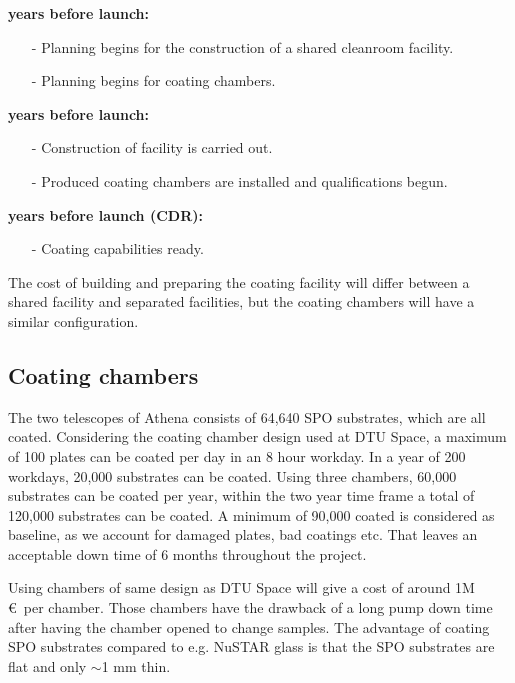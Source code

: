 \begin{description}[itemsep=1.5pt,parsep=1pt]
	\item[9] \textbf{years before launch:}
		\begin{itemize}[itemsep=1.5pt,parsep=1pt]
		\item[-] Planning begins for the construction of a shared cleanroom facility.
		\item[-] Planning begins for coating chambers.
		\end{itemize}
	\item[7-8] \textbf{years before launch:}
		\begin{itemize}[itemsep=1.5pt,parsep=1pt]
		\item[-] Construction of facility is carried out.
		\item[-] Produced coating chambers are installed and qualifications begun.
		\end{itemize}
	\item[6] \textbf{years before launch (CDR):}
		\begin{itemize}[itemsep=1.5pt,parsep=1pt]
		\item[-] Coating capabilities ready.
		\end{itemize}
\end{description}

The cost of building and preparing the coating facility will differ between a shared facility and separated facilities, but the coating chambers will have a similar configuration.

\subsection{Coating chambers}\label{sec:chambers}
The two telescopes of Athena consists of 64,640 SPO substrates, which are all coated. Considering the coating chamber design used at DTU Space, a maximum of 100 plates can be coated per day in an 8 hour workday. In a year of 200 workdays, 20,000 substrates can be coated. Using three chambers, 60,000 substrates can be coated per year, within the two year time frame a total of 120,000 substrates can be coated. A minimum of 90,000 coated is considered as baseline, as we account for damaged plates, bad coatings etc. That leaves an acceptable down time of 6 months throughout the project.

Using chambers of same design as DTU Space will give a cost of around 1M \euro\ per chamber. Those chambers have the drawback of a long pump down time after having the chamber opened to change samples. The advantage of coating SPO substrates compared to e.g. NuSTAR glass is that the SPO substrates are flat and only $\sim$1 mm thin.

